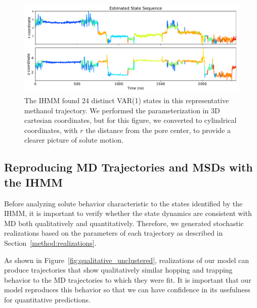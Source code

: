 \documentclass[journal=jpcbfk,manuscript=article]{achemso}
\begin{document}
  \begin{figure}
  \centering
  \includegraphics[width=\textwidth]{rz_unclustered_MET.pdf}
  \caption{The IHMM found 24 distinct VAR(1) states in this representative methanol trajectory.
  We performed the parameterization in 3D cartesian coordinates, but for this figure, we 
  converted to cylindrical coordinates, with $r$ the distance from the pore center, to 
  provide a clearer picture of solute motion.}\label{fig:rz_unclustered}
  \end{figure}
  
  \subsection{Reproducing MD Trajectories and MSDs with the IHMM}\label{section:unclustered_MSD_prediction}

  Before analyzing solute behavior characteristic to the states identified by the
  IHMM, it is important to verify whether the state dynamics are consistent with MD
  both qualitatively and quantitatively. Therefore, we generated stochastic 
  realizations based on the parameters of each trajectory as described in 
  Section~\ref{method:realizations}.
  
  As shown in Figure~\ref{fig:qualitative_unclustered}, realizations of our model 
  can produce trajectories that show qualitatively similar hopping and trapping 
  behavior to the MD trajectories to which they were fit. It is important that our
  model reproduces this behavior so that we can have confidence in its usefulness
  for quantitative predictions.
  
\end{document}
